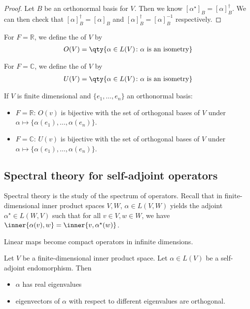 \begin{proof}
	Let $B$ be an orthonormal basis for $V$.
	Then we know $[\alpha^\star]_B = [\alpha]_B^\dagger$.
	We can then check that $[\alpha]_B^\dagger = [\alpha]_B$ and $[\alpha]_B^\dagger = [\alpha]_B^{-1}$ respectively.
\end{proof}

\begin{definition}
	For $F = \mathbb R$, we define the  of $V$ by
	\begin{align*}
		O(V) = \qty{ \alpha \in L(V) \colon \alpha \text{ is an isometry} }
	\end{align*}
\end{definition}

\begin{definition}
	For $F = \mathbb C$, we define the  of $V$ by
	\begin{align*}
		U(V) = \qty{ \alpha \in L(V) \colon \alpha \text{ is an isometry} }
	\end{align*}
\end{definition} 

\begin{remark}
	If $V$ is finite dimensional and $\{e_1, \dots, e_n\}$ an orthonormal basis:
	\begin{itemize}
		\item $F = \mathbb{R}$: $O(v)$ is bijective with the set of orthogonal bases of $V$ under $\alpha \mapsto \{\alpha(e_1), \dots, \alpha(e_n)\}$.
		\item $F = \mathbb{C}$: $U(v)$ is bijective with the set of orthogonal bases of $V$ under $\alpha \mapsto \{\alpha(e_1), \dots, \alpha(e_n)\}$.
	\end{itemize} 
\end{remark} 

\subsection{Spectral theory for self-adjoint operators}
Spectral theory is the study of the spectrum of operators.
Recall that in finite-dimensional inner product spaces $V, W$, $\alpha \in L(V, W)$ yields the adjoint $\alpha^\star \in L(W, V)$ such that for all $v \in V, w \in W$, we have $\inner{\alpha(v), w} = \inner{v, \alpha^\star(w)}$.

Linear maps become compact operators in infinite dimensions.

\begin{lemma}
	Let $V$ be a finite-dimensional inner product space.
	Let $\alpha \in L(V)$ be a self-adjoint endomorphism.
	Then 
	\begin{itemize}
		\item $\alpha$ has real eigenvalues
		\item eigenvectors of $\alpha$ with respect to different eigenvalues are orthogonal.
	\end{itemize}
\end{lemma}

